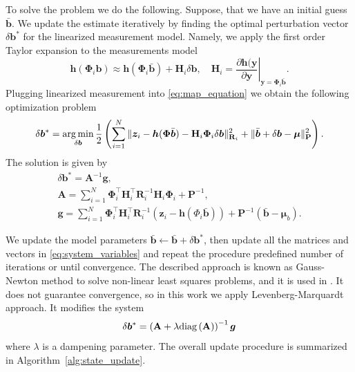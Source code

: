 To solve the problem we do the following.
Suppose, that we have an initial guess $\bar{\bm{b}}$.
We update the estimate iteratively by finding the optimal perturbation vector $\delta \bm{b}^*$ for the linearized measurement model.
Namely, we apply the first order Taylor expansion to the measurements model
\[
    \bm{h}({\bm \Phi}_i {\bm b}) \approx \bm{h}({\bm \Phi}_i \bar{\bm{b}}) + \mathbf{H}_i \delta \bm{b}, \quad
    \mathbf{H}_i = \left . \frac{\partial \bm{h}({\bm y}}{\partial \bm{y}} \right |_{{\bm y} = {\bm \Phi}_i \bar{\bm{b}}}.
\]
Plugging linearized measurement into \eqref{eq:map_equation}
we obtain the following optimization problem
\begin{align*}
    \delta \bm{b}^* = \operatorname*{arg\,min}_{\delta \bm{b}}
    \frac12 \left ( \sum_{i = 1}^N
    \|\bm{z}_i - \bm{h}({\bm \Phi}\bar{\bm{b}}) -
    \mathbf{H}_i{\bm \Phi}_i\delta \bm{b}\|_{\mathbf{R}_i}^2 +
    \|\bar{\bm{b}} + \delta \bm{b} - \bm{\mu}\|_{\mathbf{P}}^2
    \right ).
\end{align*}
The solution is given by
\begin{gather}
    \delta {\bm b}^* = \mathbf{A}^{-1}{\bm g},
    \nonumber \\
    \mathbf{A} = \sum\limits_{i=1}^N
        {\bm \Phi}_i^\top \mathbf{H}_i^\top \mathbf{R}_i^{-1} \mathbf{H}_i {\bm \Phi}_i
        + \mathbf{P}^{-1},
    \label{eq:state_update}
    \\
    {\bm g} = \sum\limits_{i=1}^N
        {\bm \Phi}_i^\top \mathbf{H}_i^\top \mathbf{R}_i^{-1} \left (
    {\bm z}_i - {\bm h}(\Phi_i \bar{{\bm b}})
    \right ) + \mathbf{P}^{-1} \left (
    \bar{{\bm b}} - {\bm \mu}_b
    \right ). \nonumber
\end{gather}

We update the model parameters
$\bar{{\bm b}} \gets \bar{{\bm b}} + \delta {\bm b}^*$,
then update all the matrices and vectors in \eqref{eq:system_variables}
and repeat the procedure predefined number of iterations or until convergence.
The described approach is known as Gauss-Newton method to solve
non-linear least squares problems, and it is used in
\cite{tong2013gaussian, barfoot}.
It does not guarantee convergence, so in this work
we apply Levenberg-Marquardt approach.
It modifies the system
\begin{equation}
\label{eq:levenberg_marquardt}
    \delta {\bm b}^* = \left (
        \mathbf{A} + \lambda {\rm diag} \left ( \mathbf{A} \right )
    \right )^{-1} {\bm g}
\end{equation}
where $\lambda$ is a dampening parameter.
The overall update procedure is summarized in Algorithm~\ref{alg:state_update}.

